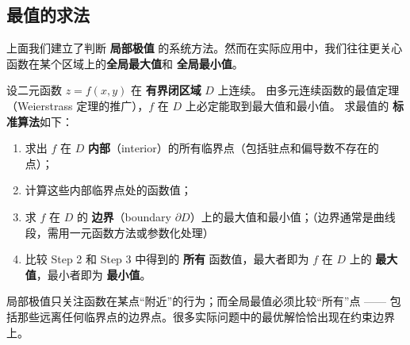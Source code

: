 \documentclass[lang=cn,11pt]{elegantbook}
\begin{document}
\subsection{最值的求法}

上面我们建立了判断 \textbf{局部极值} 的系统方法。然而在实际应用中，我们往往更关心函数在某个区域上的\textbf{全局最大值}和 \textbf{全局最小值}。

\begin{theorem}[闭区域上连续函数最值的求法] \label{theorem:global-extrema-theorem}
设二元函数 $z=f(x,y)$ 在 \textbf{有界闭区域} $D$ 上连续。
由多元连续函数的最值定理（Weierstrass 定理的推广），$f$ 在 $D$ 上必定能取到最大值和最小值。
求最值的 \textbf{标准算法}如下：
\begin{enumerate}
  \item[\textbf{Step 1}] 求出 $f$ 在 $D$ \textbf{内部}（interior）的所有临界点（包括驻点和偏导数不存在的点）；
  \item[\textbf{Step 2}] 计算这些内部临界点处的函数值；
  \item[\textbf{Step 3}] 求 $f$ 在 $D$ 的 \textbf{边界}（boundary $\partial D$）上的最大值和最小值；（边界通常是曲线段，需用一元函数方法或参数化处理）
  \item[\textbf{Step 4}] 比较 Step 2 和 Step 3 中得到的 \textbf{所有} 函数值，最大者即为 $f$ 在 $D$ 上的 \textbf{最大值}，最小者即为 \textbf{最小值}。
\end{enumerate}
\end{theorem}

\begin{note}[为什么需要考虑边界？]
局部极值只关注函数在某点“附近”的行为；而全局最值必须比较“所有”点 —— 包括那些远离任何临界点的边界点。很多实际问题中的最优解恰恰出现在约束边界上。
\end{note}
\end{document}
